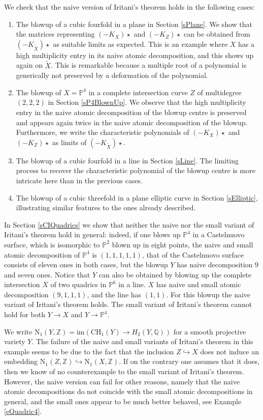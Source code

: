 \documentclass[11pt]{amsart}
\theoremstyle{plain}
\numberwithin{equation}{section}
\theoremstyle{definition}
\theoremstyle{remark}
\renewcommand{\P}{\mathbb P}
\begin{document}
We check that the naive version of Iritani's theorem holds in the following cases: 

\begin{enumerate}
\item 
The blowup of a cubic fourfold in a plane in Section \ref{sPlane}. We show that the matrices representing $(-K_X)\star$ and $(-K_Z)\star$ can be obtained from $(-K_{\widetilde{X}})\star$ as suitable limits as expected. 
This is an example where $X$ has a high multiplicity entry in its naive atomic decomposition, and this shows up again on $\widetilde{X}$. This is remarkable because  a multiple root of a polynomial is generically not preserved by a deformation of the polynomial. 
\item
The blowup of $X=\mathbb{P}^4$ in a complete intersection curve $Z$ of multidegree $(2,2,2)$
in Section \ref{sP4BlownUp}. We observe that the high multiplicity entry in the naive atomic decomposition of the blowup centre is preserved and appears again twice in the naive  atomic decomposition of the blowup. Furthermore, we write the characteristic polynomials of $(-K_X)\star$ and $(-K_Z)\star$ as limits of $(-K_{\widetilde{X}})\star$.
\item
The blowup of a cubic fourfold in a line in 
Section \ref{sLine}. The limiting process to recover the characteristic polynomial of the blowup centre is more intricate here than in the previous cases. 
\item 
The blowup of a cubic threefold in a plane elliptic curve in Section \ref{sElliptic},   illustrating similar features to the ones already described. 
\end{enumerate}

In Section \ref{sCIQuadrics} we show that neither the naive nor the small variant of Iritani's theorem hold in general: indeed, if one blows up $\P^4$ in a Castelnuovo surface, which is isomorphic to $\P^2$ blown up in eight points, the naive and small atomic decomposition of $\P^4$ is $(1,1,1,1,1)$, that of the Castelnuovo surface consists of eleven ones in both cases, but the blowup $Y$ has naive decomposition $9$ and seven ones. Notice that $Y$ can also be obtained by blowing up the complete intersection $X$ of two quadrics in $\P^6$ in a line. $X$ has naive and small atomic decomposition $(9,1,1,1)$, and the line has $(1,1)$. For this blowup the naive variant of Iritani's theorem holds. The small variant of Iritani's theorem cannot hold for both $Y\to X$ and $Y \to \P^4$.

We write $\mathrm{N}_1 (Y, \mathbb{Z}) = \mathrm{im}(\mathrm{CH}_1(Y) \to H_2(Y, \mathbb{Q}))$ for a smooth projective variety $Y$. The failure of the naive and small variants of Iritani's theorem in this example seems to be due to the fact that the inclusion $Z \hookrightarrow X$ does not induce an embedding $\mathrm{N}_1 (Z, \mathbb{Z}) \hookrightarrow \mathrm{N}_1 (X, \mathbb{Z})$. If on the contrary one assumes that it does, then we know of no counterexample to the small variant of Iritani's theorem. However, the naive version can fail for other reasons, namely that the naive atomic decompositions do not coincide with the small atomic decompositions in general, and the small ones appear to be much better behaved, see Example \ref{eQuadric4}.
\end{document}
